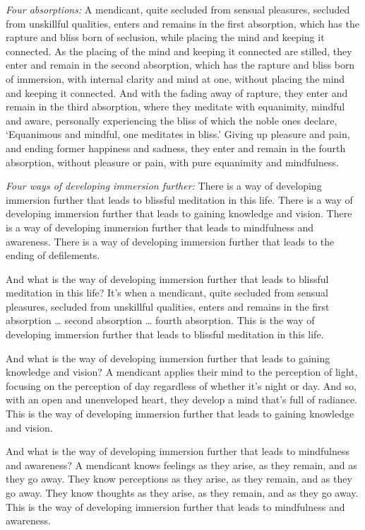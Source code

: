 \documentclass[12pt,openany]{book}%
\begin{document}
\emph{Four absorptions:} A mendicant, quite secluded from sensual pleasures, secluded from unskillful qualities, enters and remains in the first absorption, which has the rapture and bliss born of seclusion, while placing the mind and keeping it connected. As the placing of the mind and keeping it connected are stilled, they enter and remain in the second absorption, which has the rapture and bliss born of immersion, with internal clarity and mind at one, without placing the mind and keeping it connected. And with the fading away of rapture, they enter and remain in the third absorption, where they meditate with equanimity, mindful and aware, personally experiencing the bliss of which the noble ones declare, ‘Equanimous and mindful, one meditates in bliss.’ Giving up pleasure and pain, and ending former happiness and sadness, they enter and remain in the fourth absorption, without pleasure or pain, with pure equanimity and mindfulness. 

\emph{Four ways of developing immersion further:} There is a way of developing immersion further that leads to blissful meditation in this life. There is a way of developing immersion further that leads to gaining knowledge and vision. There is a way of developing immersion further that leads to mindfulness and awareness. There is a way of developing immersion further that leads to the ending of defilements. 

And what is the way of developing immersion further that leads to blissful meditation in this life? It’s when a mendicant, quite secluded from sensual pleasures, secluded from unskillful qualities, enters and remains in the first absorption … second absorption … fourth absorption. This is the way of developing immersion further that leads to blissful meditation in this life. 

And what is the way of developing immersion further that leads to gaining knowledge and vision? A mendicant applies their mind to the perception of light, focusing on the perception of day regardless of whether it’s night or day. And so, with an open and unenveloped heart, they develop a mind that’s full of radiance. This is the way of developing immersion further that leads to gaining knowledge and vision. 

And what is the way of developing immersion further that leads to mindfulness and awareness? A mendicant knows feelings as they arise, as they remain, and as they go away. They know perceptions as they arise, as they remain, and as they go away. They know thoughts as they arise, as they remain, and as they go away. This is the way of developing immersion further that leads to mindfulness and awareness. 
\end{document}
